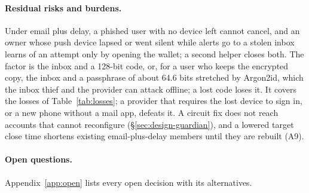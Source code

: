 \paragraph{Residual risks and burdens.} Under email plus delay, a phished
user with no device left cannot cancel, and an owner whose push device
lapsed or went silent while alerts go to a stolen inbox learns of an attempt
only by opening the wallet; a second helper closes both. The factor is the
inbox and a 128-bit code, or, for a user who keeps the encrypted copy, the
inbox and a passphrase of about 64.6 bits stretched by Argon2id, which the
inbox thief and the provider can attack offline; a lost code loses it. It covers the losses of
Table~\ref{tab:losses}; a provider that requires the lost device to sign in,
or a new phone without a mail app, defeats it. A circuit fix does not reach
accounts that cannot reconfigure (\S\ref{sec:design-guardian}), and a
lowered target close time shortens existing email-plus-delay members until
they are rebuilt (A9).

\paragraph{Open questions.} Appendix~\ref{app:open} lists every open
decision with its alternatives.
